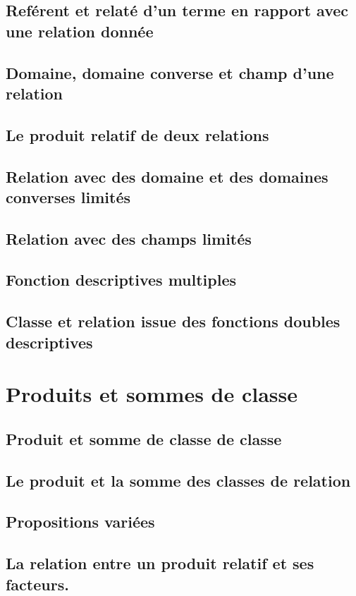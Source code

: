 \documentclass[a4paper]{book}
\begin{document}
\section{Reférent et relaté d'un terme en rapport avec une relation donnée}
\section{Domaine, domaine converse et champ d'une relation}
\label{sq:domaine}
\section{Le produit relatif de deux relations}
\section{Relation avec des domaine et des domaines converses limités}
\section{Relation avec des champs limités}
\section{Fonction descriptives multiples}
\section{Classe et relation issue des fonctions doubles descriptives}
\chapter{Produits et sommes de classe}
\section{Produit et somme de classe de classe}
\label{sq:produitsommeclasse}
\section{Le produit et la somme des classes de relation}
\section{Propositions variées}
\section{La relation entre un produit relatif et ses facteurs.}






\backmatter



\end{document}
